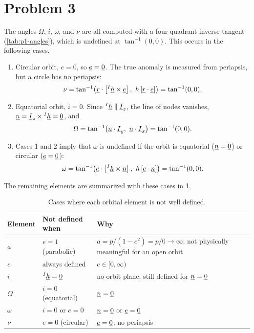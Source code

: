 \section{Problem 3}
\label{sec:problem3}

The angles $\Omega$, $i$, $\omega$, and $\nu$ are all computed with a four-quadrant inverse tangent (\cref{tab:p1-angles}), which is undefined at $\tan^{-1}(0,0)$. This occurs in the following cases.
\begin{enumerate}
    \item Circular orbit, $e=0$, so $\underline{e}=\underline{0}$. The true anomaly is measured from periapsis, but a circle has no periapsis:
    \begin{equation}
    \nu = \tan^{-1}\!\left(\vect{r}\cdot\left[\ivect{h}\times\vect{e}\right],\ h\left[\vect{r}\cdot\vect{e}\right]\right) = \tan^{-1}(0,0).
    \end{equation}
    \item Equatorial orbit, $i=0$. Since ${}^{I}\underline{h}\parallel\underline{I}_z$, the line of nodes vanishes, $\underline{n} = \underline{I}_z\times{}^{I}\underline{h} = \underline{0}$, and
    \begin{equation}
    \Omega = \tan^{-1}\!\left(\vect{n}\cdot\vect{I}_y,\ \vect{n}\cdot\vect{I}_x\right) = \tan^{-1}(0,0).
    \end{equation}
    \item Cases 1 and 2 imply that $\omega$ is undefined if the orbit is equatorial ($\underline{n}=\underline{0}$) or circular ($\underline{e}=\underline{0}$):
    \begin{equation}
    \omega = \tan^{-1}\!\left(\vect{e}\cdot\left[\ivect{h}\times\vect{n}\right],\ h\left[\vect{e}\cdot\vect{n}\right]\right) = \tan^{-1}(0,0).
    \end{equation}
\end{enumerate}
The remaining elements are summarized with these cases in \cref{tab:p3}.

\begin{table}[H]
\centering
\renewcommand{\arraystretch}{1.3}
\begin{tabularx}{\textwidth}{@{}llX@{}}
\toprule
Element & Not defined when & Why \\
\midrule
$a$ & $e=1$ (parabolic) & $a = p/(1-e^2) = p/0 \rightarrow \infty$; not physically meaningful for an open orbit \\
$e$ & always defined & $e\in[0,\infty)$ \\
$i$ & ${}^{I}\underline{h}=\underline{0}$ & no orbit plane; still defined for $\underline{n}=\underline{0}$ \\
$\Omega$ & $i=0$ (equatorial) & $\underline{n}=\underline{0}$ \\
$\omega$ & $i=0$ or $e=0$ & $\underline{n}=\underline{0}$ or $\underline{e}=\underline{0}$ \\
$\nu$ & $e=0$ (circular) & $\underline{e}=\underline{0}$; no periapsis \\
\bottomrule
\end{tabularx}
\caption{Cases where each orbital element is not well defined.}
\label{tab:p3}
\end{table}

\FloatBarrier
